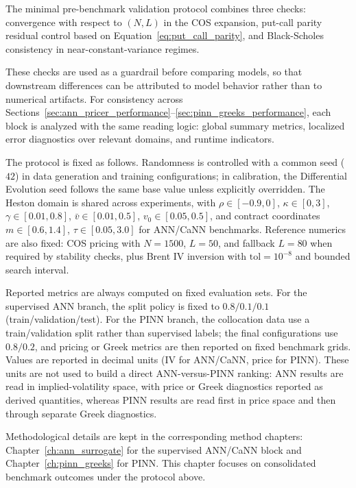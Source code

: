 The minimal pre-benchmark validation protocol combines three checks: convergence with respect to \((N,L)\) in the COS expansion, put-call parity residual control based on Equation~\eqref{eq:put_call_parity}, and Black-Scholes consistency in near-constant-variance regimes.

These checks are used as a guardrail before comparing models, so that downstream differences can be attributed to model behavior rather than to numerical artifacts. For consistency across Sections~\ref{sec:ann_pricer_performance}--\ref{sec:pinn_greeks_performance}, each block is analyzed with the same reading logic: global summary metrics, localized error diagnostics over relevant domains, and runtime indicators.

The protocol is fixed as follows. Randomness is controlled with a common seed (\(42\)) in data generation and training configurations; in calibration, the Differential Evolution seed follows the same base value unless explicitly overridden. The Heston domain is shared across experiments, with \(\rho\in[-0.9,0]\), \(\kappa\in[0,3]\), \(\gamma\in[0.01,0.8]\), \(\bar v\in[0.01,0.5]\), \(v_0\in[0.05,0.5]\), and contract coordinates \(m\in[0.6,1.4]\), \(\tau\in[0.05,3.0]\) for ANN/CaNN benchmarks. Reference numerics are also fixed: COS pricing with \(N=1500\), \(L=50\), and fallback \(L=80\) when required by stability checks, plus Brent IV inversion with \(\mathrm{tol}=10^{-8}\) and bounded search interval.

Reported metrics are always computed on fixed evaluation sets. For the supervised ANN branch, the split policy is fixed to \(0.8/0.1/0.1\) (train/validation/test). For the PINN branch, the collocation data use a train/validation split rather than supervised labels; the final configurations use \(0.8/0.2\), and pricing or Greek metrics are then reported on fixed benchmark grids. Values are reported in decimal units (IV for ANN/CaNN, price for PINN). These units are not used to build a direct ANN-versus-PINN ranking: ANN results are read in implied-volatility space, with price or Greek diagnostics reported as derived quantities, whereas PINN results are read first in price space and then through separate Greek diagnostics.

Methodological details are kept in the corresponding method chapters: Chapter~\ref{ch:ann_surrogate} for the supervised ANN/CaNN block and Chapter~\ref{ch:pinn_greeks} for PINN. This chapter focuses on consolidated benchmark outcomes under the protocol above.

